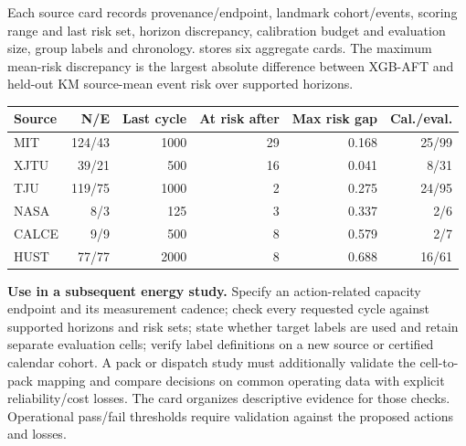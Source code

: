 \documentclass[10pt,a4paper]{article}
\begin{document}
Each source card records provenance/endpoint, landmark cohort/events, scoring range and last risk set, horizon discrepancy, calibration budget and evaluation size, group labels and chronology.  stores six aggregate cards. The maximum mean-risk discrepancy is the largest absolute difference between XGB-AFT and held-out KM source-mean event risk over supported horizons.
\begin{center}\small
\begin{minipage}{\linewidth}\centering
{}\label{tab:S6}
\begin{tabular}{lrrrrr}\toprule
Source & N/E & Last cycle & At risk after & Max risk gap & Cal./eval.\\\midrule
MIT & 124/43 & 1000 & 29 & 0.168 & 25/99\\
XJTU & 39/21 & 500 & 16 & 0.041 & 8/31\\
TJU & 119/75 & 1000 & 2 & 0.275 & 24/95\\
NASA & 8/3 & 125 & 3 & 0.337 & 2/6\\
CALCE & 9/9 & 500 & 8 & 0.579 & 2/7\\
HUST & 77/77 & 2000 & 8 & 0.688 & 16/61\\
\bottomrule\end{tabular}\end{minipage}
\end{center}
\textbf{Use in a subsequent energy study.} Specify an action-related capacity endpoint and its measurement cadence; check every requested cycle against supported horizons and risk sets; state whether target labels are used and retain separate evaluation cells; verify label definitions on a new source or certified calendar cohort. A pack or dispatch study must additionally validate the cell-to-pack mapping and compare decisions on common operating data with explicit reliability/cost losses. The card organizes descriptive evidence for those checks. Operational pass/fail thresholds require validation against the proposed actions and losses.
\end{document}
